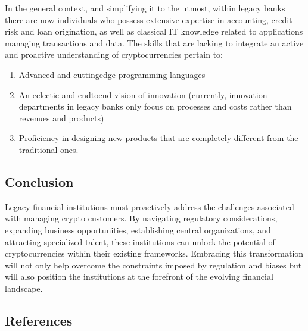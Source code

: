 \documentclass[letterpaper,10pt,english]{jupyterBook}
\begin{document}
\sphinxAtStartPar
In the general context, and simplifying it to the utmost, within legacy banks there are now individuals who possess extensive expertise in accounting, credit risk and loan origination, as well as classical IT knowledge related to applications managing transactions and data. The skills that are lacking to integrate an active and proactive understanding of cryptocurrencies pertain to:
\begin{enumerate}
%
\item {} 
\sphinxAtStartPar
Advanced and cutting\sphinxhyphen{}edge programming languages

\item {} 
\sphinxAtStartPar
An eclectic and end\sphinxhyphen{}to\sphinxhyphen{}end vision of innovation (currently, innovation departments in legacy banks only focus on processes and costs rather than revenues and products)

\item {} 
\sphinxAtStartPar
Proficiency in designing new products that are completely different from the traditional ones.

\end{enumerate}


\subsection{Conclusion}
\label{\detokenize{LEGACY/legacy:conclusion}}
\sphinxAtStartPar
Legacy financial institutions must proactively address the challenges associated with managing crypto customers. By navigating regulatory considerations, expanding business opportunities, establishing central organizations, and attracting specialized talent, these institutions can unlock the potential of cryptocurrencies within their existing frameworks. Embracing this transformation will not only help overcome the constraints imposed by regulation and biases but will also position the institutions at the forefront of the evolving financial landscape.




\subsection{References}
\label{\detokenize{LEGACY/legacy:references}}
\sphinxstepscope
\end{document}
